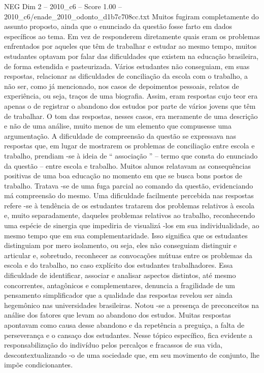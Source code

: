 \begin{textsample}{NEG Dim 2 – 2010\_c6 – Score 1.00 – 2010\_c6/enade\_2010\_odonto\_d1b7c708cc.txt}
Muitos fugiram completamente do assunto proposto, ainda que o enunciado da questão fosse farto em dados específicos ao tema.
Em vez de responderem diretamente quais eram os problemas enfrentados por aqueles que têm de trabalhar e estudar ao mesmo tempo, muitos estudantes optavam por falar das dificuldades que existem na educação brasileira, de forma estendida e pasteurizada.
Vários estudantes não conseguiam, em suas respostas, relacionar as dificuldades de conciliação da escola com o trabalho, a não ser, como já mencionado, nos casos de depoimentos pessoais, relatos de experiência, ou seja, traços de uma biografia.
Assim, eram respostas cujo teor era apenas o de registrar o abandono dos estudos por parte de vários jovens que têm de trabalhar.
O tom das respostas, nesses casos, era meramente de uma descrição e não de uma análise, muito menos de um elemento que compusesse uma argumentação.
A dificuldade de compreensão da questão se expressava nas respostas que, em lugar de mostrarem os problemas de conciliação entre escola e trabalho, prendiam -se à ideia de “ associação ” – termo que consta do enunciado da questão – entre escola e trabalho.
Muitos alunos relatavam as consequências positivas de uma boa educação no momento em que se busca bons postos de trabalho.
Tratava -se de uma fuga parcial ao comando da questão, evidenciando má compreensão do mesmo.
Uma dificuldade facilmente percebida nas respostas refere -se à tendência de os estudantes tratarem dos problemas relativos à escola e, muito separadamente, daqueles problemas relativos ao trabalho, reconhecendo uma espécie de sinergia que impediria de visualizá -los em sua individualidade, ao mesmo tempo que em sua complementaridade.
Isso significa que os estudantes distinguiam por mero isolamento, ou seja, eles não conseguiam distinguir e articular e, sobretudo, reconhecer as convocações mútuas entre os problemas da escola e do trabalho, no caso explícito dos estudantes trabalhadores.
Essa dificuldade de identificar, associar e analisar aspectos distintos, até mesmo concorrentes, antagônicos e complementares, denuncia a fragilidade de um pensamento simplificador que a qualidade das respostas revelou ser ainda hegemônico nas universidades brasileiras.
Notou -se a presença de preconceitos na análise dos fatores que levam ao abandono dos estudos.
Muitas respostas apontavam como causa desse abandono e da repetência a preguiça, a falta de perseverança e o cansaço dos estudantes.
Nesse tópico específico, fica evidente a responsabilização do indivíduo pelos percalços e fracassos de sua vida, descontextualizando -o de uma sociedade que, em seu movimento de conjunto, lhe impõe condicionantes.

\end{textsample}
